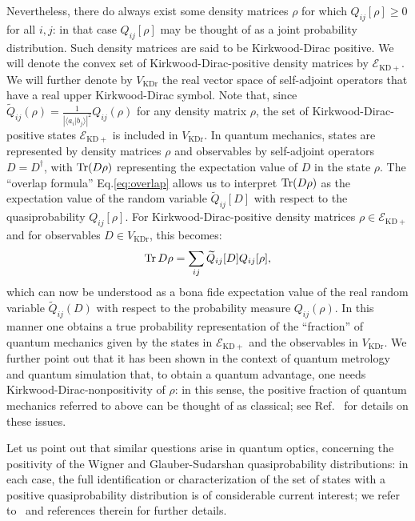 \documentclass[a4paper, notitlepage, 11pt]{article}
\numberwithin{equation}{section}
\newcommand{\bracket}[2]{\langle #1 | #2\rangle}
\newcommand{\mcl}[1]{\ensuremath{\mathcal{#1}}}
\newcommand{\EcalKDC}{{\mcl E}_{\mathrm{KD+}}}
\newcommand{\VR}{V_{\mathrm{KDr}}}
\begin{document}
Nevertheless, there do always exist some density matrices $\rho$ for which $Q_{ij}[\rho]\geq 0$ for all $i,j$: in that case $Q_{ij}[\rho]$ may be thought of as a joint probability distribution.  Such density matrices are said to be Kirkwood-Dirac positive. We will denote the convex set of Kirkwood-Dirac-positive density matrices by $\EcalKDC$. We will further denote  by $\VR$ the real vector space of self-adjoint operators that have a real upper Kirkwood-Dirac symbol. Note that, since $\widetilde{Q}_{ij}(\rho) = \frac{1}{\left|\bracket{a_i}{b_j}\right|^{2}}Q_{ij}(\rho)$ for any density matrix $\rho$, the set of Kirkwood-Dirac-positive states $\EcalKDC$ is included in $\VR$. 
In quantum mechanics, states are represented by density matrices $\rho$ and observables by self-adjoint operators $D=D^\dagger$, with $\Tr(D\rho)$ representing the expectation value of $D$ in the state $\rho$. The ``overlap formula'' Eq.\eqref{eq:overlap} allows us to interpret $\Tr(D\rho)$ as the expectation value of the random variable $\widetilde{Q}_{ij}[D]$ with respect to the quasiprobability $Q_{ij}[\rho]$. For Kirkwood-Dirac-positive density matrices $\rho\in\EcalKDC$ and for observables $D\in \VR$, this becomes: 
\begin{equation}
    \Tr D\rho= \sum_{ij} \widetilde{Q}_{ij}[D]Q_{ij}[\rho],
\end{equation}
which can now be understood as a  bona fide expectation value of the  real random variable $\widetilde{Q}_{ij}(D)$ with respect to the probability measure $Q_{ij}(\rho)$. In this manner one obtains a true probability representation of the ``fraction'' of quantum mechanics given by the states in $\EcalKDC$ and the observables in $\VR$. We further point out that it has been shown in the context of quantum metrology \cite{arvidsson-shukur2020} and quantum simulation \cite{pashayan2015} that, to obtain a quantum advantage, one needs Kirkwood-Dirac-nonpositivity of $\rho$: in this sense, the positive fraction of quantum mechanics referred to above can be thought of as classical; see Ref.~\cite{arvidssonshukur2024properties} for details on these issues.

Let us  point out that similar questions arise in quantum optics, concerning the positivity of the Wigner and Glauber-Sudarshan quasiprobability distributions: in each case, the full identification or characterization of the set of states with a positive quasiprobability distribution is of considerable current interest; we refer to~\cite{gross2006,vanherstraetencerf2021,herstraetenetal2023,diasprata2023a,Bievre19,ryspagal15}  and references therein for further details. 
\end{document}
